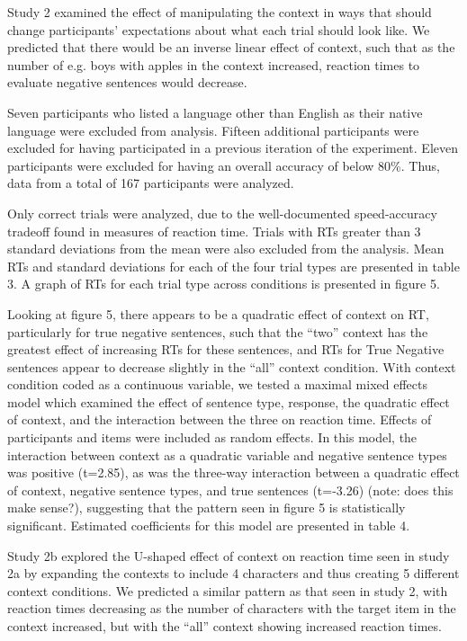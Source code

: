 \documentclass[10pt,letterpaper]{article}
\begin{document}
Study 2 examined the effect of manipulating the context in ways that should change participants' expectations about what each trial should look like.  We predicted that there would be an inverse linear effect of context, such that as the number of e.g. boys with apples in the context increased, reaction times to evaluate negative sentences would decrease.  

Seven participants who listed a language other than English as their native language were excluded from analysis.  Fifteen additional participants were excluded for having participated in a previous iteration of the experiment.  Eleven participants were excluded for having an overall accuracy of below 80\%.  Thus, data from a total of 167 participants were analyzed.  

Only correct trials were analyzed, due to the well-documented speed-accuracy tradeoff found in measures of reaction time.  Trials with RTs greater than 3 standard deviations from the mean were also excluded from the analysis.  Mean RTs and standard deviations for each of the four trial types are presented in table 3.  A graph of RTs for each trial type across conditions is presented in figure 5.  

Looking at figure 5, there appears to be a quadratic effect of context on RT, particularly for true negative sentences, such that the ``two'' context has the greatest effect of increasing RTs for these sentences, and RTs for True Negative sentences appear to decrease slightly in the ``all'' context condition.  With context condition coded as a continuous variable, we tested a maximal mixed effects model which examined the effect of sentence type, response, the quadratic effect of context, and the interaction between the three on reaction time.  Effects of participants and items were included as random effects.  In this model, the interaction between context as a quadratic variable and negative sentence types was positive (t=2.85), as was the three-way interaction between a quadratic effect of context, negative sentence types, and true sentences (t=-3.26) (note: does this make sense?), suggesting that the pattern seen in figure 5 is statistically significant.  Estimated coefficients for this model are presented in table 4.  





Study 2b explored the U-shaped effect of context on reaction time seen in study 2a by expanding the contexts to include 4 characters and thus creating 5 different context conditions.  We predicted a similar pattern as that seen in study 2, with reaction times decreasing as the number of characters with the target item in the context increased, but with the ``all'' context showing increased reaction times.  
\end{document}
